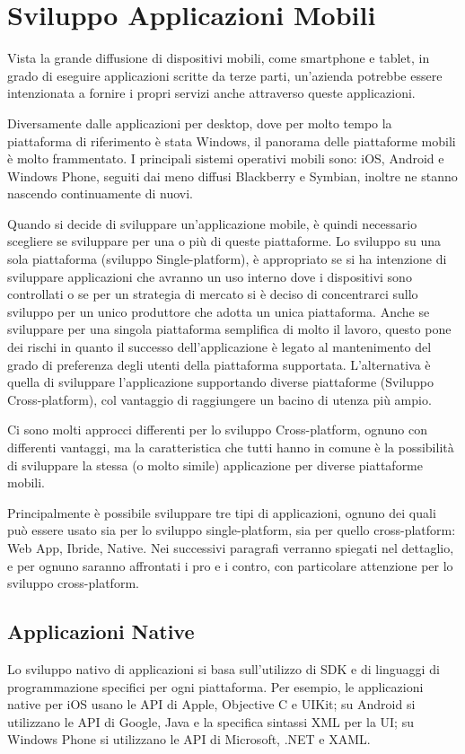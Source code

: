 \chapter{Sviluppo Applicazioni Mobili}
	Vista la grande diffusione di dispositivi mobili, come smartphone e tablet, in grado di eseguire applicazioni scritte da terze parti, un'azienda potrebbe essere intenzionata a fornire i propri servizi anche attraverso queste applicazioni.
	
	Diversamente dalle applicazioni per desktop, dove per molto tempo la piattaforma di riferimento è stata Windows, il panorama delle piattaforme mobili è molto frammentato.
	I principali sistemi operativi mobili sono: iOS, Android e Windows Phone, seguiti dai meno diffusi Blackberry e Symbian, inoltre ne stanno nascendo continuamente di nuovi.
	
	Quando si decide di sviluppare un'applicazione mobile, è quindi necessario scegliere se sviluppare per una o più di queste piattaforme.
	Lo sviluppo su una sola piattaforma (sviluppo Single-platform), è appropriato se si ha intenzione di sviluppare applicazioni che avranno un uso interno dove i dispositivi sono controllati o se per un strategia di mercato si è deciso di concentrarci sullo sviluppo per un unico produttore che adotta un unica piattaforma.
	Anche se sviluppare per una singola piattaforma semplifica di molto il lavoro, questo pone dei rischi in quanto il successo dell'applicazione è legato al mantenimento del grado di preferenza degli utenti della piattaforma supportata.
	L'alternativa è quella di sviluppare l'applicazione supportando diverse piattaforme (Sviluppo Cross-platform), col vantaggio di raggiungere un bacino di utenza più ampio.
	
	Ci sono molti approcci differenti per lo sviluppo Cross-platform, ognuno con differenti vantaggi, ma la caratteristica che tutti hanno in comune è la possibilità di sviluppare la stessa (o molto simile) applicazione per diverse piattaforme mobili.
	 
	Principalmente è possibile sviluppare tre tipi di applicazioni, ognuno dei quali può essere usato sia per lo sviluppo single-platform, sia per quello cross-platform: Web App, Ibride, Native.
	Nei successivi paragrafi verranno spiegati nel dettaglio, e per ognuno saranno affrontati i pro e i contro, con particolare attenzione per lo sviluppo cross-platform.
	
	\section{Applicazioni Native}
		Lo sviluppo nativo di applicazioni si basa sull'utilizzo di SDK e di linguaggi di programmazione specifici per ogni piattaforma. Per esempio, le applicazioni native per iOS usano le API di Apple, Objective C e UIKit; su Android si utilizzano le API di Google, Java e la specifica sintassi XML per la UI; su Windows Phone si utilizzano le API di Microsoft, .NET e XAML.

